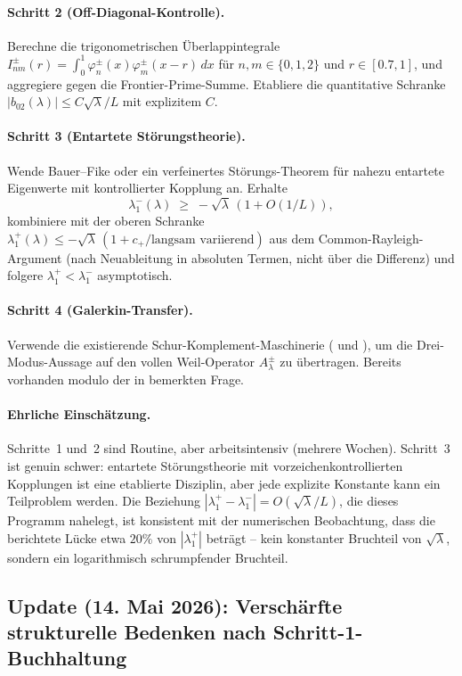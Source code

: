 \documentclass[11pt,a4paper]{article}
\theoremstyle{remark}
\theoremstyle{plain}
\begin{document}
\paragraph{Schritt 2 (Off-Diagonal-Kontrolle).} Berechne die trigonometrischen Überlappintegrale $I_{nm}^\pm(r)=\int_0^1 \varphi_n^\pm(x)\varphi_m^\pm(x-r)\,dx$ für $n,m\in\{0,1,2\}$ und $r\in[0.7,1]$, und aggregiere gegen die Frontier-Prime-Summe. Etabliere die quantitative Schranke $|b_{02}(\lambda)|\leq C\sqrt\lambda/L$ mit explizitem $C$.

\paragraph{Schritt 3 (Entartete Störungstheorie).} Wende Bauer--Fike oder ein verfeinertes Störungs-Theorem für nahezu entartete Eigenwerte mit kontrollierter Kopplung an. Erhalte
\[
  \lambda_1^-(\lambda) \;\geq\; -\sqrt\lambda\,(1 + O(1/L)),
\]
kombiniere mit der oberen Schranke $\lambda_1^+(\lambda)\leq -\sqrt\lambda\,(1 + c_+/\text{langsam variierend})$ aus dem Common-Rayleigh-Argument (nach Neuableitung in absoluten Termen, nicht über die Differenz) und folgere $\lambda_1^+<\lambda_1^-$ asymptotisch.

\paragraph{Schritt 4 (Galerkin-Transfer).} Verwende die existierende Schur-Komplement-Maschinerie ( und ), um die Drei-Modus-Aussage auf den vollen Weil-Operator $A_\lambda^\pm$ zu übertragen. Bereits vorhanden modulo der in  bemerkten Frage.

\paragraph{Ehrliche Einschätzung.} Schritte~1 und~2 sind Routine, aber arbeitsintensiv (mehrere Wochen). Schritt~3 ist genuin schwer: entartete Störungstheorie mit vorzeichenkontrollierten Kopplungen ist eine etablierte Disziplin, aber jede explizite Konstante kann ein Teilproblem werden. Die Beziehung $|\lambda_1^+-\lambda_1^-|=O(\sqrt\lambda/L)$, die dieses Programm nahelegt, ist konsistent mit der numerischen Beobachtung, dass die berichtete Lücke etwa $20\%$ von $|\lambda_1^+|$ beträgt -- kein konstanter Bruchteil von $\sqrt\lambda$, sondern ein logarithmisch schrumpfender Bruchteil.

\subsection{Update (14. Mai 2026): Verschärfte strukturelle Bedenken nach
            Schritt-1-Buchhaltung}
\label{sec:k0-strengthened}
\end{document}
